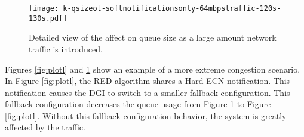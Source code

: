 \begin{figure}
\texttt{[image: k-qsizeot-softnotificationsonly-64mbpstraffic-120s-130s.pdf]}
\caption{Detailed view of the affect on queue size as a large amount network traffic is introduced.}
\label{fig:plotk}
\end{figure}

Figures \ref{fig:plotl} and \ref{fig:plotk} show an example of a more extreme congestion scenario.
In Figure \ref{fig:plotl}, the \ac{RED} algorithm shares a Hard \ac{ECN} notification.
This notification causes the \ac{DGI} to switch to a smaller fallback configuration.
This fallback configuration decreases the queue usage from Figure \ref{fig:plotk} to Figure \ref{fig:plotl}.
Without this fallback configuration behavior, the system is greatly affected by the traffic.

